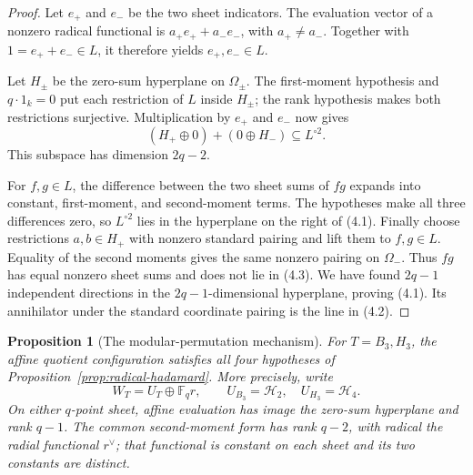 \documentclass[11pt]{article}
\newtheorem{proposition}[theorem]{Proposition}
\theoremstyle{definition}
\theoremstyle{remark}
\newcommand{\F}{\mathbb{F}}
\begin{document}
\begin{proof}
Let \(e_+\) and \(e_-\) be the two sheet indicators.  The evaluation
vector of a nonzero radical functional is \(a_+e_++a_-e_-\), with
\(a_+\ne a_-\).
Together with \(1=e_++e_-\in L\), it therefore yields
\(e_+,e_-\in L\).

Let \(H_\pm\) be the zero-sum hyperplane on \(\Omega_\pm\).
The first-moment hypothesis and \(q\cdot1_k=0\) put each restriction of \(L\)
inside \(H_\pm\); the rank hypothesis makes both restrictions
surjective.  Multiplication by \(e_+\) and \(e_-\) now gives
\[
 (H_+\oplus0)+(0\oplus H_-)\subseteq L^{\circ2}.              \tag{4.3}
\]
This subspace has dimension \(2q-2\).

For \(f,g\in L\), the difference between the two sheet sums of \(fg\)
expands into constant, first-moment, and second-moment terms.  The
hypotheses make all three differences zero, so \(L^{\circ2}\) lies in
the hyperplane on the right of (4.1).  Finally choose restrictions
\(a,b\in H_+\) with nonzero standard pairing and lift them to
\(f,g\in L\).  Equality of the second moments gives the same nonzero
pairing on \(\Omega_-\).  Thus \(fg\) has equal nonzero sheet sums and
does not lie in (4.3).  We have found \(2q-1\) independent directions
in the \(2q-1\)-dimensional hyperplane, proving (4.1).  Its annihilator
under the standard coordinate pairing is the line in (4.2).
\end{proof}

\begin{proposition}[The modular-permutation mechanism]
\label{prop:modular-sheet-mechanism}
For \(T=B_3,H_3\), the affine quotient configuration satisfies all four
hypotheses of Proposition~\ref{prop:radical-hadamard}.  More precisely,
write
\[
 W_T=U_T\oplus\F_q r,\qquad
 U_{B_3}=\mathcal H_2,\quad U_{H_3}=\mathcal H_4.
\]
On either \(q\)-point sheet, affine evaluation has image the zero-sum
hyperplane and rank \(q-1\).  The common second-moment form has rank
\(q-2\), with radical the radial functional \(r^\vee\); that functional
is constant on each sheet and its two constants are distinct.
\end{proposition}
\end{document}

